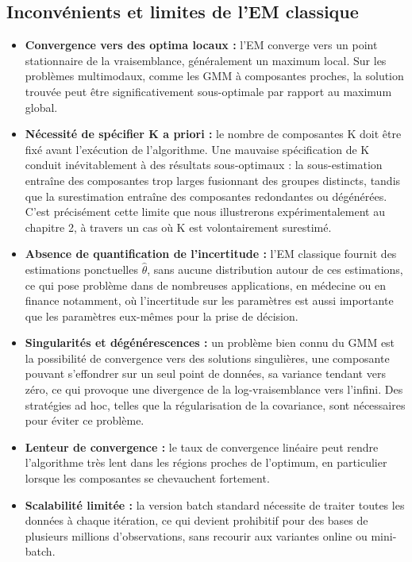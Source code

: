 \subsection{Inconvénients et limites de l'EM classique}
\begin{itemize}
\item \textbf{Convergence vers des optima locaux : }l'EM converge vers un point stationnaire de la vraisemblance, généralement un maximum local. Sur les problèmes multimodaux, comme les GMM à composantes proches, la solution trouvée peut être significativement sous-optimale par rapport au maximum global.
\item \textbf{Nécessité de spécifier K a priori : }le nombre de composantes K doit être fixé avant l'exécution de l'algorithme. Une mauvaise spécification de K conduit inévitablement à des résultats sous-optimaux : la sous-estimation entraîne des composantes trop larges fusionnant des groupes distincts, tandis que la surestimation entraîne des composantes redondantes ou dégénérées. C'est précisément cette limite que nous illustrerons expérimentalement au chapitre 2, à travers un cas où K est volontairement surestimé.
\item \textbf{Absence de quantification de l'incertitude : }l'EM classique fournit des estimations ponctuelles $\hat{\theta }$, sans aucune distribution autour de ces estimations, ce qui pose problème dans de nombreuses applications, en médecine ou en finance notamment, où l'incertitude sur les paramètres est aussi importante que les paramètres eux-mêmes pour la prise de décision.
\item \textbf{Singularités et dégénérescences : }un problème bien connu du GMM est la possibilité de convergence vers des solutions singulières, une composante pouvant s'effondrer sur un seul point de données, sa variance tendant vers zéro, ce qui provoque une divergence de la log-vraisemblance vers l'infini. Des stratégies ad hoc, telles que la régularisation de la covariance, sont nécessaires pour éviter ce problème.
\item \textbf{Lenteur de convergence : }le taux de convergence linéaire peut rendre l'algorithme très lent dans les régions proches de l'optimum, en particulier lorsque les composantes se chevauchent fortement.
\item \textbf{Scalabilité limitée : }la version batch standard nécessite de traiter toutes les données à chaque itération, ce qui devient prohibitif pour des bases de plusieurs millions d'observations, sans recourir aux variantes online ou mini-batch.
\end{itemize}
